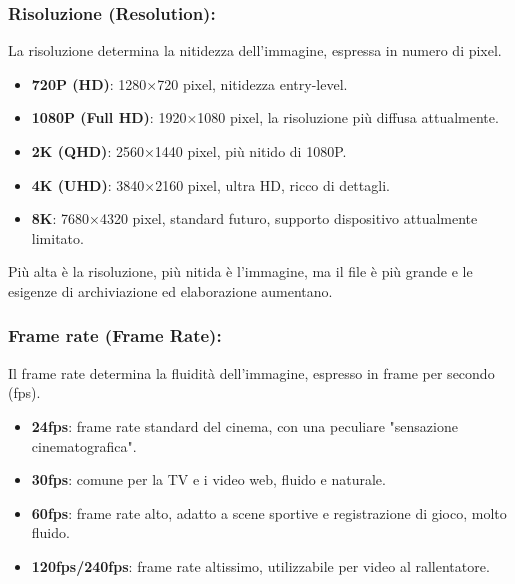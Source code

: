 


\subsubsection*{Risoluzione (Resolution):}

La risoluzione determina la nitidezza dell'immagine, espressa in numero di pixel.

\begin{itemize}
  \item \textbf{720P (HD)}: 1280×720 pixel, nitidezza entry-level.
  \item \textbf{1080P (Full HD)}: 1920×1080 pixel, la risoluzione più diffusa attualmente.
  \item \textbf{2K (QHD)}: 2560×1440 pixel, più nitido di 1080P.
  \item \textbf{4K (UHD)}: 3840×2160 pixel, ultra HD, ricco di dettagli.
  \item \textbf{8K}: 7680×4320 pixel, standard futuro, supporto dispositivo attualmente limitato.
\end{itemize}

Più alta è la risoluzione, più nitida è l'immagine, ma il file è più grande e le esigenze di archiviazione ed elaborazione aumentano.

\subsubsection*{Frame rate (Frame Rate):}

Il frame rate determina la fluidità dell'immagine, espresso in frame per secondo (fps).

\begin{itemize}
  \item \textbf{24fps}: frame rate standard del cinema, con una peculiare "sensazione cinematografica".
  \item \textbf{30fps}: comune per la TV e i video web, fluido e naturale.
  \item \textbf{60fps}: frame rate alto, adatto a scene sportive e registrazione di gioco, molto fluido.
  \item \textbf{120fps/240fps}: frame rate altissimo, utilizzabile per video al rallentatore.
\end{itemize}

